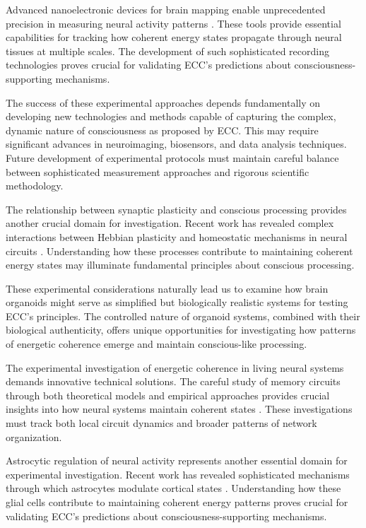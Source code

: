 \begin{refsection}
Advanced nanoelectronic devices for brain mapping enable unprecedented precision in measuring neural activity patterns \cite{Kuzum2014}. These tools provide essential capabilities for tracking how coherent energy states propagate through neural tissues at multiple scales. The development of such sophisticated recording technologies proves crucial for validating ECC's predictions about consciousness-supporting mechanisms.

The success of these experimental approaches depends fundamentally on developing new technologies and methods capable of capturing the complex, dynamic nature of consciousness as proposed by ECC. This may require significant advances in neuroimaging, biosensors, and data analysis techniques. Future development of experimental protocols must maintain careful balance between sophisticated measurement approaches and rigorous scientific methodology.

The relationship between synaptic plasticity and conscious processing provides another crucial domain for investigation. Recent work has revealed complex interactions between Hebbian plasticity and homeostatic mechanisms in neural circuits \cite{Turrigiano2017}. Understanding how these processes contribute to maintaining coherent energy states may illuminate fundamental principles about conscious processing.

These experimental considerations naturally lead us to examine how brain organoids might serve as simplified but biologically realistic systems for testing ECC's principles. The controlled nature of organoid systems, combined with their biological authenticity, offers unique opportunities for investigating how patterns of energetic coherence emerge and maintain conscious-like processing.

The experimental investigation of energetic coherence in living neural systems demands innovative technical solutions. The careful study of memory circuits through both theoretical models and empirical approaches provides crucial insights into how neural systems maintain coherent states \cite{Lisman2018}. These investigations must track both local circuit dynamics and broader patterns of network organization.

Astrocytic regulation of neural activity represents another essential domain for experimental investigation. Recent work has revealed sophisticated mechanisms through which astrocytes modulate cortical states \cite{Poskanzer2016}. Understanding how these glial cells contribute to maintaining coherent energy patterns proves crucial for validating ECC's predictions about consciousness-supporting mechanisms.


\end{refsection}
